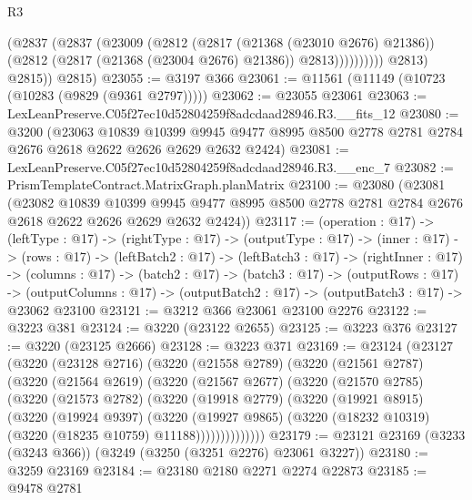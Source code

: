 \begin{lexlean}{R3}
\begin{coremodule}
                      (@2837
                        (@2837
                          (@23009
                            (@2812
                              (@2817 (@21368 (@23010 @2676) @21386))
                              (@2812 (@2817 (@21368 (@23004 @2676) @21386)) @2813))))))))))
            @2813)
          @2815))
      @2815)
@23055 := @3197 @366
@23061 := @11561 (@11149 (@10723 (@10283 (@9829 (@9361 @2797)))))
@23062 := @23055 @23061
@23063 := LexLeanPreserve.C05f27ec10d52804259f8adcdaad28946.R3.__fits_12
@23080 := @3200
    (@23063
      @10839
      @10399
      @9945
      @9477
      @8995
      @8500
      @2778
      @2781
      @2784
      @2676
      @2618
      @2622
      @2626
      @2629
      @2632
      @2424)
@23081 := LexLeanPreserve.C05f27ec10d52804259f8adcdaad28946.R3.__enc_7
@23082 := PrismTemplateContract.MatrixGraph.planMatrix
@23100 := @23080
    (@23081
      (@23082
        @10839
        @10399
        @9945
        @9477
        @8995
        @8500
        @2778
        @2781
        @2784
        @2676
        @2618
        @2622
        @2626
        @2629
        @2632
        @2424))
@23117 := (operation : @17) ->
  (leftType : @17) ->
  (rightType : @17) ->
  (outputType : @17) ->
  (inner : @17) ->
  (rows : @17) ->
  (leftBatch2 : @17) ->
  (leftBatch3 : @17) ->
  (rightInner : @17) ->
  (columns : @17) ->
  (batch2 : @17) ->
  (batch3 : @17) ->
  (outputRows : @17) ->
  (outputColumns : @17) -> (outputBatch2 : @17) -> (outputBatch3 : @17) -> @23062 @23100
@23121 := @3212 @366 @23061 @23100 @2276
@23122 := @3223 @381
@23124 := @3220 (@23122 @2655)
@23125 := @3223 @376
@23127 := @3220 (@23125 @2666)
@23128 := @3223 @371
@23169 := @23124
    (@23127
      (@3220
        (@23128 @2716)
        (@3220
          (@21558 @2789)
          (@3220
            (@21561 @2787)
            (@3220
              (@21564 @2619)
              (@3220
                (@21567 @2677)
                (@3220
                  (@21570 @2785)
                  (@3220
                    (@21573 @2782)
                    (@3220
                      (@19918 @2779)
                      (@3220
                        (@19921 @8915)
                        (@3220
                          (@19924 @9397)
                          (@3220
                            (@19927 @9865)
                            (@3220 (@18232 @10319) (@3220 (@18235 @10759) @11188))))))))))))))
@23179 := @23121 @23169 (@3233 (@3243 @366)) (@3249 (@3250 (@3251 @2276) @23061 @3227))
@23180 := @3259 @23169
@23184 := @23180 @2180 @2271 @2274 @22873
@23185 := @9478 @2781

\end{coremodule}
\end{lexlean}
